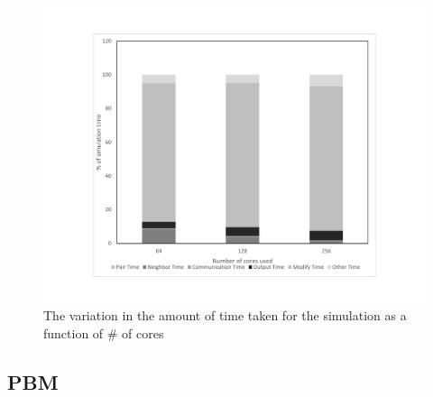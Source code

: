\documentclass[preprint,11pt,authoryear]{elsarticle}
\begin{document}
\begin{figure}[H]
\centering
\includegraphics[scale=0.5]{rslts_DEM_percent_plot.pdf}
\caption{The variation in the amount of time taken for the simulation as a function of \# of cores}
\label{fig:rslts_DEM_percent_plot}
\end{figure}


\subsection{PBM}

 
\end{document}
